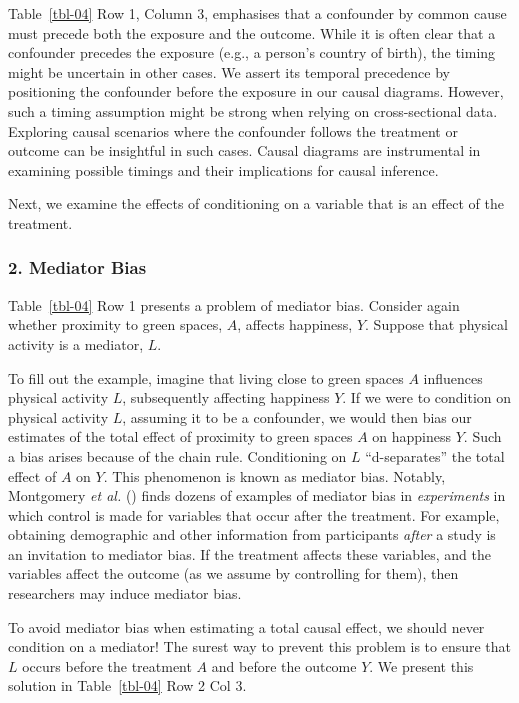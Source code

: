 \documentclass[
  singlecolumn]{article}
\begin{document}
Table~\ref{tbl-04} Row 1, Column 3, emphasises that a confounder by
common cause must precede both the exposure and the outcome. While it is
often clear that a confounder precedes the exposure (e.g., a person's
country of birth), the timing might be uncertain in other cases. We
assert its temporal precedence by positioning the confounder before the
exposure in our causal diagrams. However, such a timing assumption might
be strong when relying on cross-sectional data. Exploring causal
scenarios where the confounder follows the treatment or outcome can be
insightful in such cases. Causal diagrams are instrumental in examining
possible timings and their implications for causal inference.

Next, we examine the effects of conditioning on a variable that is an
effect of the treatment.

\subsubsection{2. Mediator Bias}\label{mediator-bias}

Table~\ref{tbl-04} Row 1 presents a problem of mediator bias. Consider
again whether proximity to green spaces, \(A\), affects happiness,
\(Y\). Suppose that physical activity is a mediator, \(L\).

To fill out the example, imagine that living close to green spaces \(A\)
influences physical activity \(L\), subsequently affecting happiness
\(Y\). If we were to condition on physical activity \(L\), assuming it
to be a confounder, we would then bias our estimates of the total effect
of proximity to green spaces \(A\) on happiness \(Y\). Such a bias
arises because of the chain rule. Conditioning on \(L\) ``d-separates''
the total effect of \(A\) on \(Y\). This phenomenon is known as mediator
bias. Notably, Montgomery \emph{et al.}
() finds dozens of examples of
mediator bias in \emph{experiments} in which control is made for
variables that occur after the treatment. For example, obtaining
demographic and other information from participants \emph{after} a study
is an invitation to mediator bias. If the treatment affects these
variables, and the variables affect the outcome (as we assume by
controlling for them), then researchers may induce mediator bias.

To avoid mediator bias when estimating a total causal effect, we should
never condition on a mediator! The surest way to prevent this problem is
to ensure that \(L\) occurs before the treatment \(A\) and before the
outcome \(Y\). We present this solution in Table~\ref{tbl-04} Row 2 Col
3.
\end{document}
